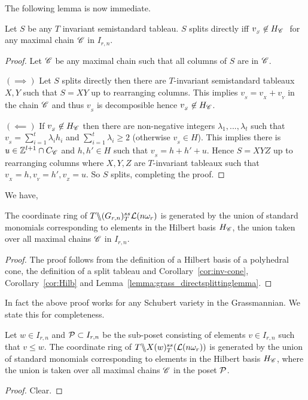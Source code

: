 The following lemma is now immediate.
\begin{lemma}
    \label{lemma:grass_directsplittinglemma}
    Let \(S\) be any \(T\) invariant semistandard tableau. \(S\) splits directly iff \(v_{_S} \not\in H_{\SC}\ \) for any maximal chain $\mathscr{C}$ in \(I_{r,n}\).
\end{lemma}
\begin{proof} 
    Let \(\mathscr{C}\) be any maximal chain such that all columns of \(S\) are in \(\mathscr{C}\).

    \((\implies)\)
    Let \(S\) splits directly then there are \(T\)-invariant semistandard tableaux \(X,Y\) such that 
    \(S = XY\) up to rearranging columns. 
    This implies \(v_{_S} = v_{_X} + v_{_Y}\) in the chain \(\mathscr{C}\) 
    and thus \(v_{_S}\) is decomposible hence \(v_{_S} \not\in H_{\mathscr{C}}\).

    \((\impliedby)\) If \(v_{_S} \not\in H_{\mathscr{C}}\) then there are non-negative integers 
    \(\lambda_1,...,\lambda_t\) such that \(v_{_S} = \sum_{i=1}^t \lambda_i h_i\) and \(\sum_{i=1}^t \lambda_i \ge 2\) (otherwise \(v_{_S} \in H\)). 
    This implies there is \(u\in \mathbb{Z}^{l+1}\cap C_{\mathscr{C}} \) and \(h,h' \in H\) 
    such that \(v_{_S} = h + h' + u\). Hence \(S = XYZ\) up to rearranging columns where \(X,Y,Z\) are \(T\)-invariant tableaux such that \(v_{_X}=h,v_{_Y}=h',v_{_Z}=u\).   So $S$ splits, completing the proof.
\end{proof}

We have,
\begin{theorem}
\label{thm:main}
    The coordinate ring of \(T \backslash\mkern-6mu\backslash (G_{{r},{n}})^{ss}_T{{\cal L}(n\omega_r)}\) is generated by the union of standard monomials corresponding to elements in the Hilbert basis $H_{\mathscr{C}}$, the union taken over all maximal chains $\mathscr{C}$ in \(I_{r,n}\).
\end{theorem}
\begin{proof}
The proof follows from the definition of a Hilbert basis of a polyhedral cone, the definition of a split tableau and Corollary~\ref{cor:inv-cone}, Corollary~\ref{cor:Hilb} and Lemma~\ref{lemma:grass_directsplittinglemma}.

\end{proof}

In fact the above proof works for any Schubert variety in the Grassmannian. We state this for completeness.
\begin{corollary}
\label{cor:schub}
    Let \(w \in I_{r,n}\) and \({\cal P}\subset I_{r,n}\) be the sub-poset consisting of elements $v \in I_{r,n}$ such that $v \leq w$. The coordinate ring of \(T \backslash\mkern-6mu\backslash X(w)^{ss}_T({\cal L}(n\omega_r))\) is generated by the union of standard monomials corresponding to elements in the Hilbert basis $H_{\mathscr{C}}$, where the union is taken over all maximal chains $\mathscr{C}$ in the poset \({\cal P}\).
\end{corollary}
\begin{proof}
 Clear.
\end{proof}

